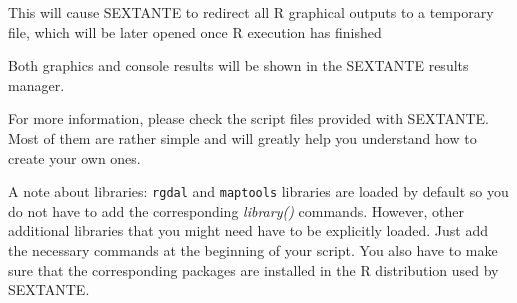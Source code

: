 This will cause SEXTANTE to redirect all R graphical outputs to a temporary file, which will be later opened once R execution has finished

Both graphics and console results will be shown in the SEXTANTE results manager.

For more information, please check the script files provided with SEXTANTE. Most of them are rather simple and will greatly help you understand how to create your own ones.

A note about libraries: \texttt{rgdal} and \texttt{maptools} libraries are loaded by default so you do not have to add the corresponding \emph{library()} commands. However, other additional libraries that you might need have to be explicitly loaded. Just add the necessary commands at the beginning of your script. You also have to make sure that the corresponding packages are installed in the R distribution used by SEXTANTE.










